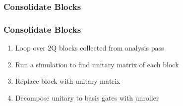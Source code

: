 \documentclass[aspectratio=169,11pt,hyperref={colorlinks=true}]{beamer}
\begin{document}
\subsubsection{Consolidate Blocks}
\begin{frame}
    \frametitle{Consolidate Blocks}
    \begin{enumerate}
        \item Loop over 2Q blocks collected from analysis pass
        \item Run a simulation to find unitary matrix of each block
        \item Replace block with unitary matrix
        \item Decompose unitary to basis gates with unroller
    \end{enumerate}
    \begin{center}
    \vspace{3em}
\end{center}
\end{frame}
\end{document}

